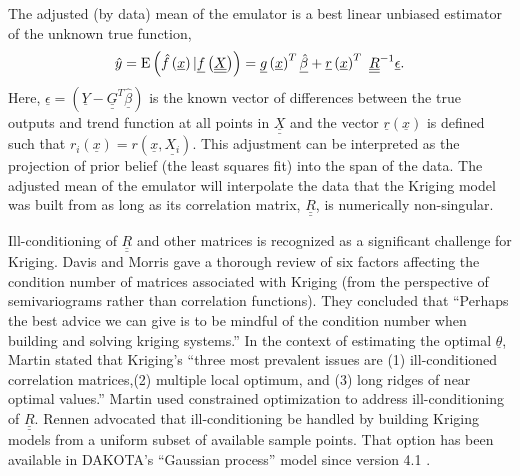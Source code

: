 \documentclass{article}
\begin{document}
The adjusted (by data) mean of the emulator is a best linear unbiased 
estimator of the unknown true function,
\begin{equation}
\hat{y}={\rm E}\left(\hat{f}\left(\underline{x}\right)|\underline{f}\left(\underline{\underline{X}}\right)\right)=\underline{g}\left(\underline{x}\right)^T\underline{\hat{\beta}}+\underline{r}\left(\underline{x}\right)^T\ \underline{\underline{R}}^{-1}\underline{\epsilon}.
\label{Eq:KrigMean}
\end{equation}
Here, $\underline{\epsilon}=\left(\underline{Y}-\underline{\underline{G}}^T\underline{\hat{\beta}}\right)$ 
is the known vector of differences between the true outputs and trend 
function at all points in $\underline{\underline{X}}$ and the vector 
$\underline{r}\left(\underline{x}\right)$ is defined such that
$r_i\left(\underline{x}\right)=r\left(\underline{x},\underline{X_i}\right)$.  
This adjustment can be interpreted as the projection of prior belief 
(the least squares fit) into the span of the data. The adjusted mean 
of the emulator will interpolate the data that the Kriging model was 
built from as long as its correlation matrix, $\underline{\underline{R}}$, 
is numerically non-singular.\newline

Ill-conditioning of $\underline{\underline{R}}$ and other matrices
is recognized as a significant challenge for Kriging. Davis and 
Morris \cite{davis1997six} gave a thorough review of six factors 
affecting the condition number of matrices associated with Kriging
(from the perspective of semivariograms rather than correlation 
functions).  They concluded that 
``Perhaps the best advice we can give is to be mindful of the 
condition number when building and solving kriging systems.''
In the context of estimating the optimal $\underline{\theta}$,
Martin \cite{martin2009computational} stated that Kriging's
``three most prevalent issues are (1) ill-conditioned correlation 
matrices,(2) multiple local optimum, and (3) long ridges of near 
optimal values.'' Martin used constrained optimization to 
address ill-conditioning of $\underline{\underline{R}}$.
Rennen \cite{rennen2009subset} advocated that ill-conditioning
be handled by building Kriging models from a uniform subset of 
available sample points.  That option has been available in
DAKOTA's ``Gaussian process'' model since version 4.1 
\cite{eldred2007dakota}.\newline
\end{document}
